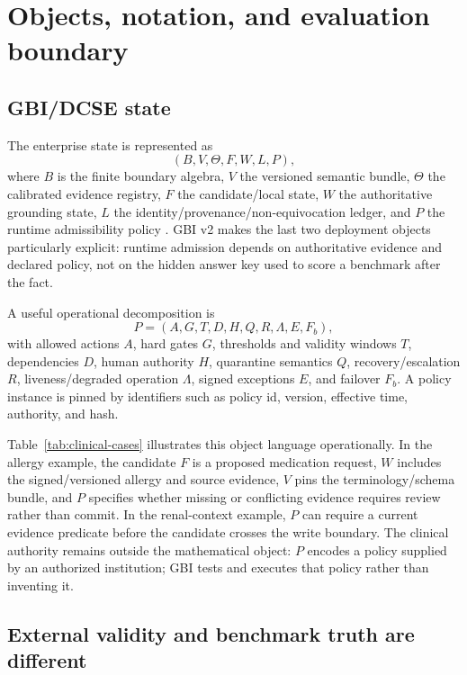 \documentclass[11pt]{article}
\begin{document}
\section{Objects, notation, and evaluation boundary}

\subsection{GBI/DCSE state}

The enterprise state is represented as
\[
(B,V,\Theta,F,W,L,P),
\]
where \(B\) is the finite boundary algebra, \(V\) the versioned semantic bundle, \(\Theta\) the calibrated evidence registry, \(F\) the candidate/local state, \(W\) the authoritative grounding state, \(L\) the identity/provenance/non-equivocation ledger, and \(P\) the runtime admissibility policy \cite{spivey2026gbi}. GBI v2 makes the last two deployment objects particularly explicit: runtime admission depends on authoritative evidence and declared policy, not on the hidden answer key used to score a benchmark after the fact.

A useful operational decomposition is
\[
P=(A,G,T,D,H,Q,R,\Lambda,E,F_b),
\]
with allowed actions \(A\), hard gates \(G\), thresholds and validity windows \(T\), dependencies \(D\), human authority \(H\), quarantine semantics \(Q\), recovery/escalation \(R\), liveness/degraded operation \(\Lambda\), signed exceptions \(E\), and failover \(F_b\). A policy instance is pinned by identifiers such as policy id, version, effective time, authority, and hash.

Table~\ref{tab:clinical-cases} illustrates this object language operationally. In the allergy example, the candidate \(F\) is a proposed medication request, \(W\) includes the signed/versioned allergy and source evidence, \(V\) pins the terminology/schema bundle, and \(P\) specifies whether missing or conflicting evidence requires review rather than commit. In the renal-context example, \(P\) can require a current evidence predicate before the candidate crosses the write boundary. The clinical authority remains outside the mathematical object: \(P\) encodes a policy supplied by an authorized institution; GBI tests and executes that policy rather than inventing it.

\subsection{External validity and benchmark truth are different}
\end{document}
